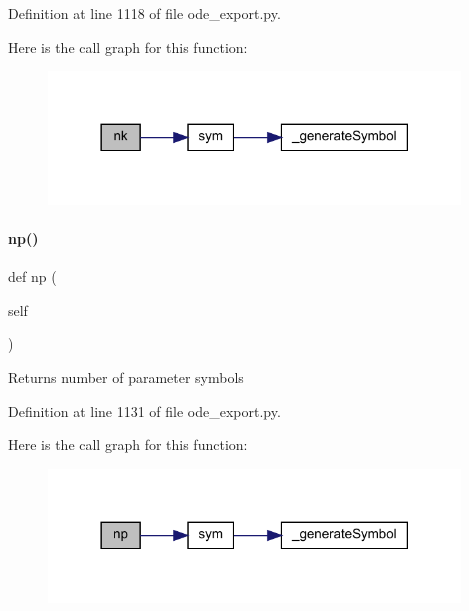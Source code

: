 Definition at line 1118 of file ode\+\_\+export.\+py.

Here is the call graph for this function\+:
\nopagebreak
\begin{figure}[H]
\begin{center}
\leavevmode
\includegraphics[width=310pt]{classamici_1_1ode__export_1_1_o_d_e_model_a07767f24c77537a68972e99a79ef93aa_cgraph}
\end{center}
\end{figure}
\mbox{\label{classamici_1_1ode__export_1_1_o_d_e_model_a7278a09e012ba867faf10d809e13fb81}} 
\paragraph{\texorpdfstring{np()}{np()}}
{\footnotesize\ttfamily def np (\begin{DoxyParamCaption}\item[{}]{self }\end{DoxyParamCaption})}

\begin{DoxyReturn}{Returns}
number of parameter symbols 
\end{DoxyReturn}


Definition at line 1131 of file ode\+\_\+export.\+py.

Here is the call graph for this function\+:
\nopagebreak
\begin{figure}[H]
\begin{center}
\leavevmode
\includegraphics[width=310pt]{classamici_1_1ode__export_1_1_o_d_e_model_a7278a09e012ba867faf10d809e13fb81_cgraph}
\end{center}
\end{figure}
\mbox{\label{classamici_1_1ode__export_1_1_o_d_e_model_a47906a8f4c249a513f4d6ca7c12d2304}} 
